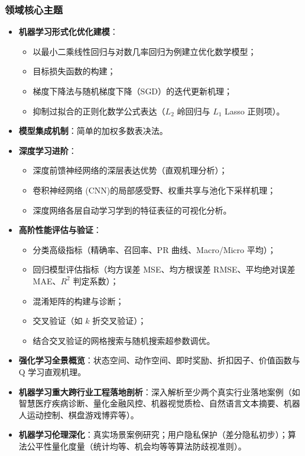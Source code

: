 \subsubsection{领域核心主题}
\begin{itemize}
    \item \textbf{机器学习形式化优化建模}：
    \begin{itemize}
        \item 以最小二乘线性回归与对数几率回归为例建立优化数学模型；
        \item 目标损失函数的构建；
        \item 梯度下降法与随机梯度下降（SGD）的迭代更新机理；
        \item 抑制过拟合的正则化数学公式表达（$L_2$ 岭回归与 $L_1$ Lasso 正则项）。
    \end{itemize}
    \item \textbf{模型集成机制}：简单的加权多数表决法。
    \item \textbf{深度学习进阶}：
    \begin{itemize}
        \item 深度前馈神经网络的深层表达优势（直观机理分析）；
        \item 卷积神经网络 (CNN)的局部感受野、权重共享与池化下采样机理；
        \item 深度网络各层自动学习学到的特征表征的可视化分析。
    \end{itemize}
    \item \textbf{高阶性能评估与验证}：
    \begin{itemize}
        \item 分类高级指标（精确率、召回率、PR 曲线、Macro/Micro 平均）；
        \item 回归模型评估指标（均方误差 MSE、均方根误差 RMSE、平均绝对误差 MAE、$R^2$ 判定系数）；
        \item 混淆矩阵的构建与诊断；
        \item 交叉验证（如 $k$ 折交叉验证）；
        \item 结合交叉验证的网格搜索与随机搜索超参数调优。
    \end{itemize}
    \item \textbf{强化学习全景概览}：状态空间、动作空间、即时奖励、折扣因子、价值函数与 Q 学习直观机理。
    \item \textbf{机器学习重大跨行业工程落地剖析}：深入解析至少两个真实行业落地案例（如智慧医疗疾病诊断、量化金融风控、机器视觉质检、自然语言文本摘要、机器人运动控制、棋盘游戏博弈等）。
    \item \textbf{机器学习伦理深化}：真实场景案例研究；用户隐私保护（差分隐私初步）；算法公平性量化度量（统计均等、机会均等等算法防歧视准则）。
\end{itemize}


